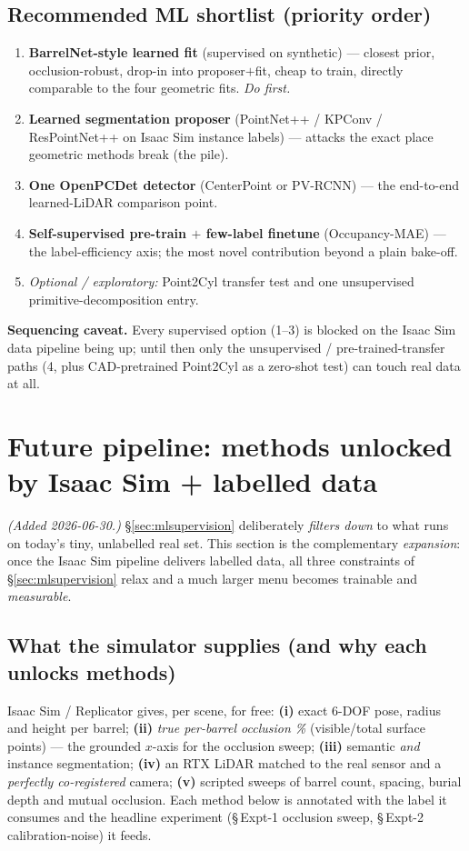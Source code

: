 \documentclass[10pt,a4paper]{article}
\begin{document}
\subsection{Recommended ML shortlist (priority order)}
\begin{enumerate}[leftmargin=1.6em,itemsep=2pt,topsep=2pt]
  \item \textbf{BarrelNet-style learned fit} (supervised on synthetic) --- closest prior,
  occlusion-robust, drop-in into proposer$+$fit, cheap to train, directly comparable to the
  four geometric fits. \emph{Do first.}
  \item \textbf{Learned segmentation proposer} (PointNet++ / KPConv / ResPointNet++ on Isaac
  Sim instance labels) --- attacks the exact place geometric methods break (the pile).
  \item \textbf{One OpenPCDet detector} (CenterPoint or PV-RCNN) --- the end-to-end
  learned-LiDAR comparison point.
  \item \textbf{Self-supervised pre-train $+$ few-label finetune} (Occupancy-MAE) --- the
  label-efficiency axis; the most novel contribution beyond a plain bake-off.
  \item \emph{Optional / exploratory:} Point2Cyl transfer test and one unsupervised
  primitive-decomposition entry.
\end{enumerate}

\noindent\textbf{Sequencing caveat.} Every supervised option (1--3) is blocked on the Isaac
Sim data pipeline being up; until then only the unsupervised / pre-trained-transfer paths
(4, plus CAD-pretrained Point2Cyl as a zero-shot test) can touch real data at all.

\section{Future pipeline: methods unlocked by Isaac Sim + labelled data}
\label{sec:future}

\emph{(Added 2026-06-30.)} \S\ref{sec:mlsupervision} deliberately \emph{filters down} to what
runs on today's tiny, unlabelled real set. This section is the complementary \emph{expansion}:
once the Isaac Sim pipeline delivers labelled data, all three constraints of
\S\ref{sec:mlsupervision} relax and a much larger menu becomes trainable and \emph{measurable}.

\subsection{What the simulator supplies (and why each unlocks methods)}
Isaac Sim / Replicator gives, per scene, for free: \textbf{(i)} exact 6-DOF pose, radius and
height per barrel; \textbf{(ii)} \emph{true per-barrel occlusion \%} (visible/total surface
points) --- the grounded $x$-axis for the occlusion sweep; \textbf{(iii)} semantic \emph{and}
instance segmentation; \textbf{(iv)} an RTX LiDAR matched to the real sensor and a
\emph{perfectly co-registered} camera; \textbf{(v)} scripted sweeps of barrel count, spacing,
burial depth and mutual occlusion. Each method below is annotated with the label it consumes
and the headline experiment (\S\,Expt-1 occlusion sweep, \S\,Expt-2 calibration-noise) it feeds.
\end{document}
